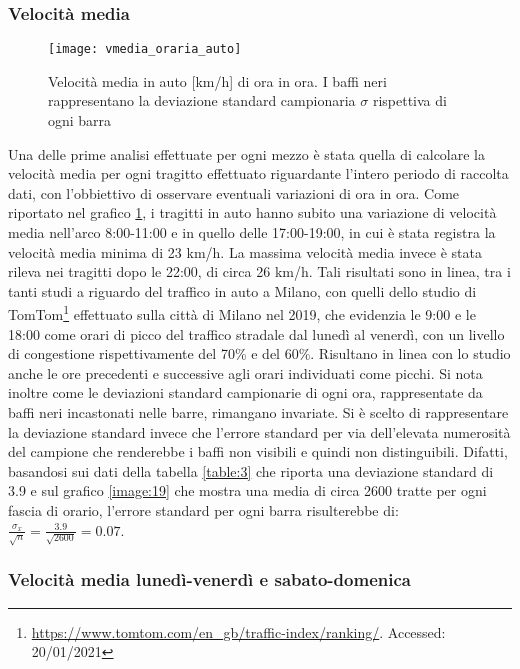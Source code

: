 \subsubsection{Velocità media}

\begin{figure}[H]
\texttt{[image: vmedia\_oraria\_auto]}
\caption{Velocità media in auto [km/h] di ora in ora. I baffi neri rappresentano la deviazione standard campionaria $\sigma$ rispettiva di ogni barra}
\label{image:3}
\end{figure}

Una delle prime analisi effettuate per ogni mezzo è stata quella di calcolare la velocità media per ogni tragitto effettuato riguardante l'intero periodo di raccolta dati, con l'obbiettivo di osservare eventuali variazioni di ora in ora. Come riportato nel grafico \ref{image:3}, i tragitti in auto hanno subito una variazione di velocità media nell'arco 8:00-11:00 e in quello delle 17:00-19:00, in cui è stata registra la velocità media minima di 23 km/h. La massima velocità media invece è stata rileva nei tragitti dopo le 22:00, di circa 26 km/h. Tali risultati sono in linea, tra i tanti studi a riguardo del traffico in auto a Milano, con quelli dello studio di TomTom\footnote{\url{https://www.tomtom.com/en_gb/traffic-index/ranking/}. Accessed: 20/01/2021} effettuato sulla città di Milano nel 2019, che evidenzia le 9:00 e le 18:00 come orari di picco del traffico stradale dal lunedì al venerdì, con un livello di congestione rispettivamente del 70\% e del 60\%. Risultano in linea con lo studio anche le ore precedenti e successive agli orari individuati come picchi. Si nota inoltre come le deviazioni standard campionarie di ogni ora, rappresentate da baffi neri incastonati nelle barre, rimangano invariate. Si è scelto di rappresentare la deviazione standard invece che l'errore standard per via dell'elevata numerosità del campione che renderebbe i baffi non visibili e quindi non distinguibili. Difatti, basandosi sui dati della tabella \ref{table:3} che riporta una deviazione standard di 3.9 e sul grafico \ref{image:19} che mostra una media di circa 2600 tratte per ogni fascia di orario, l'errore standard per ogni barra risulterebbe di: $\frac{\sigma_x}{\sqrt{n}} = \frac{3.9}{\sqrt{2600}} = 0.07$.

\subsubsection{Velocità media lunedì-venerdì e sabato-domenica}

